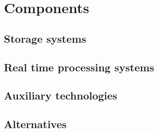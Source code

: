 \chapter{Components}
\label{chap:components}


\section{Storage systems}





\section{Real time processing systems}





\section{Auxiliary technologies}







\section{Alternatives}






